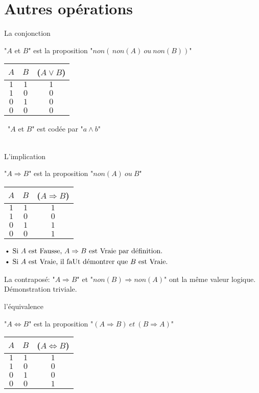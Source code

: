 \documentclass[12pt,twoside,a4paper]{article}
\begin{document}
	\section{Autres op\'erations}
		\begin{liste}
			\item La conjonction
				\begin{defi}"$A$ et $B$" est la proposition "$non(\,non(A)\ ou\ non(B))$"\end{defi}
				\begin{tabular}{ c | c | c  }
					$A$ & $B$ &($A\vee B$)\\\hline 
					$1$&$1$&$1$\\
					$1$&$0$&$0$\\
					$0$&$1$&$0$\\
					$0$&$0$&$0$\\
				\end{tabular} \textbullet\ "$A$ et $B$" est cod\'ee par "$a\land b$"\\\\
			\item L'implication 
				\begin{defi}"$A\Rightarrow B$" est la proposition "$non(A)\ ou\ B$"\end{defi}
				\begin{tabular}{ c | c | c  }
					$A$ & $B$ &($A\Rightarrow B$)\\\hline 
					$1$&$1$&$1$\\
					$1$&$0$&$0$\\
					$0$&$1$&$1$\\
					$0$&$0$&$1$\\
				\end{tabular}
				$\begin{aligned}
					&\text{\textbullet}\ \text{Si }A\text{ est Fausse, }A\Rightarrow B\text{ est Vraie par d\'efinition.}\\
					&\text{\textbullet}\ \text{Si }A\text{ est Vraie, il faUt d\'emontrer que }B\text{ est Vraie.}
				\end{aligned}$\pagebreak
			\item La contrapos\'e: "$A\Rightarrow B$" et "$non(B)\Rightarrow non(A)$" ont la m\^eme valeur logique.\\
				D\'emonstration triviale.\\
			\item l'\'equivalence
				\begin{defi}"$A\Leftrightarrow B$" est la proposition "$(A\Rightarrow B)\ et\ (B\Rightarrow A)$" \end{defi}
				\begin{tabular}{ c | c | c  }
					$A$ & $B$ &($A\Leftrightarrow B$)\\\hline 
					$1$&$1$&$1$\\
					$1$&$0$&$0$\\
					$0$&$1$&$0$\\
					$0$&$0$&$1$\\
				\end{tabular}
		\end{liste}
\end{document}
